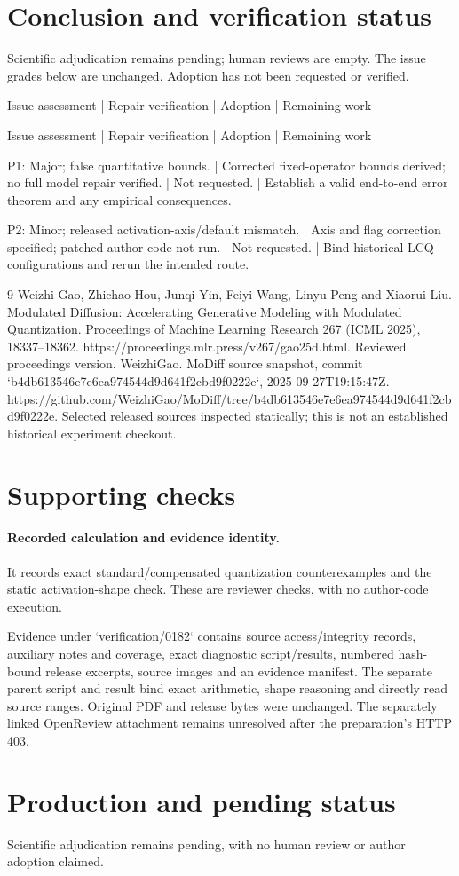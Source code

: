 \documentclass[10pt]{article}
\begin{document}
\section*{Conclusion and verification status}
Scientific adjudication remains pending; human reviews are empty. The issue grades below are unchanged. Adoption has not been requested or verified.\par
Issue assessment | Repair verification | Adoption | Remaining work\par
Issue assessment | Repair verification | Adoption | Remaining work\par
P1: Major; false quantitative bounds. | Corrected fixed-operator bounds derived; no full model repair verified. | Not requested. | Establish a valid end-to-end error theorem and any empirical consequences.\par
P2: Minor; released activation-axis/default mismatch. | Axis and flag correction specified; patched author code not run. | Not requested. | Bind historical LCQ configurations and rerun the intended route.\par
9 Weizhi Gao, Zhichao Hou, Junqi Yin, Feiyi Wang, Linyu Peng and Xiaorui Liu. Modulated Diffusion: Accelerating Generative Modeling with Modulated Quantization. Proceedings of Machine Learning Research 267 (ICML 2025), 18337–18362. https://proceedings.mlr.press/v267/gao25d.html. Reviewed proceedings version. WeizhiGao. MoDiff source snapshot, commit `b4db613546e7e6ea974544d9d641f2cbd9f0222e`, 2025-09-27T19:15:47Z. https://github.com/WeizhiGao/MoDiff/tree/b4db613546e7e6ea974544d9d641f2cbd9f0222e. Selected released sources inspected statically; this is not an established historical experiment checkout.\par
\section*{Supporting checks}
\paragraph*{Recorded calculation and evidence identity.}\mbox{}\par
It records exact standard/compensated quantization counterexamples and the static activation-shape check. These are reviewer checks, with no author-code execution.\par
Evidence under `verification/0182` contains source access/integrity records, auxiliary notes and coverage, exact diagnostic script/results, numbered hash-bound release excerpts, source images and an evidence manifest. The separate parent script and result bind exact arithmetic, shape reasoning and directly read source ranges. Original PDF and release bytes were unchanged. The separately linked OpenReview attachment remains unresolved after the preparation’s HTTP 403.\par
\section*{Production and pending status}
Scientific adjudication remains pending, with no human review or author adoption claimed.\par
\end{document}
